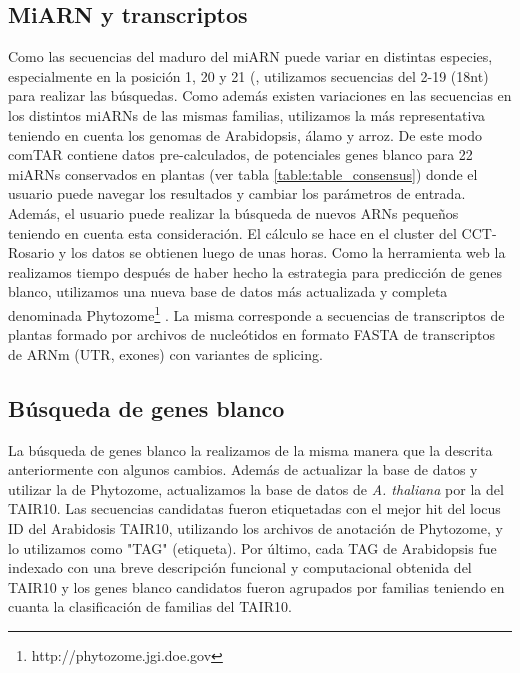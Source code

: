 \subsection{MiARN y transcriptos}
Como las secuencias del maduro del miARN puede variar en distintas especies, especialmente en la posición 1, 20 y 21 (\citep{Chorostecki05072012}, utilizamos secuencias del 2-19 (18nt) para realizar las búsquedas.
Como además existen variaciones en las secuencias en los distintos miARNs de las mismas familias, utilizamos la más representativa teniendo en cuenta los genomas de Arabidopsis, álamo y arroz. 
De este modo comTAR contiene datos pre-calculados, de potenciales genes blanco para 22 miARNs conservados en plantas (ver tabla \ref{table:table_consensus}) donde el usuario puede navegar los resultados y cambiar los parámetros de entrada.
Además, el usuario puede realizar la búsqueda de nuevos ARNs pequeños teniendo en cuenta esta consideración. El cálculo se hace en el cluster del CCT-Rosario y los datos se obtienen luego de unas horas.
Como la herramienta web la realizamos tiempo después de haber hecho la estrategia para predicción de genes blanco, utilizamos una nueva base de datos más actualizada y completa denominada Phytozome\footnote{http://phytozome.jgi.doe.gov} \citep{Goodstein2012}. 
La misma corresponde a secuencias de transcriptos de plantas formado por archivos de nucleótidos en formato FASTA de transcriptos de ARNm (UTR, exones) con variantes de splicing.

\subsection{Búsqueda de genes blanco}
La búsqueda de genes blanco la realizamos de la misma manera que la descrita anteriormente con algunos cambios.
Además de actualizar la base de datos y utilizar la de Phytozome, actualizamos la base de datos de \textit{A. thaliana} por la del TAIR10.
Las secuencias candidatas fueron etiquetadas con el mejor hit del locus ID del Arabidosis TAIR10, utilizando los archivos de anotación de Phytozome, y lo utilizamos como "TAG" (etiqueta).
Por último, cada TAG de Arabidopsis fue indexado con una breve descripción funcional y computacional obtenida del TAIR10 y los genes blanco candidatos fueron agrupados por familias teniendo en cuanta la clasificación de familias del TAIR10.

